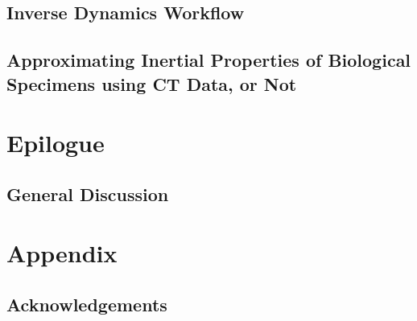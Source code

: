 \documentclass[12pt,a4paper,twoside]{report}
\newcommand\cleartoleftpage{%
\clearpage
}
\newcommand\cleartorightpage{%
\clearpage
\hbox{}
}
\begin{document}
\chapter{Inverse Dynamics Workflow}\label{cpt:dynamics_workflow}
%

\cleartoleftpage
\chapter[Inertial Properties]{Approximating Inertial Properties of Biological Specimens using CT Data, or Not}\label{cpt:inertials}
%



\cleartorightpage
\part{Epilogue}
\chapter{General Discussion}\label{cpt:generaldiscussion}
\clearpage
%



\cleartorightpage
\part{Appendix}\label{appendix}

\addtocounter{chapter}{+1}
\setcounter{section}{0}

\chapter{Acknowledgements}\label{acknowledgements}


% 
% 
\end{document}
